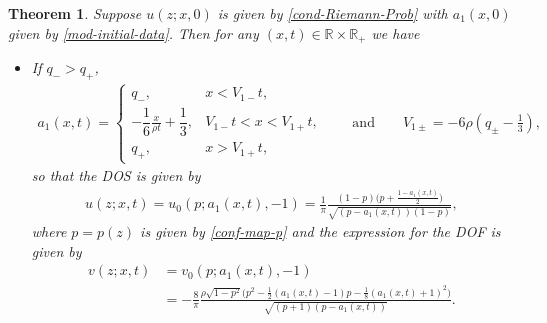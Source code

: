 \documentclass[10pt,a4paper]{amsart}
\numberwithin{equation}{section}
\newtheorem{Theorem}{Theorem}[section]
\def\R{{\mathbb R}}
\begin{document}
\begin{Theorem}\label{Mod-DOS}
Suppose $u(z;x,0)$
is given by \eqref{cond-Riemann-Prob}
with $a_1(x,0)$ given by \eqref{mod-initial-data}. Then for any $(x,t)\in \R\times \R_+$
we have
\begin{itemize}\itemsep=0pt
\item[$(i)$] If $q_->q_+$,
\begin{align*}
a_1(x,t)=\begin{cases}
q_-,& x<V_{1-}t,\\
-\dfrac{1}{6}\frac{x}{\rho t}+\dfrac{1}{3},& V_{1-}t<x<V_{1+}t,\\
q_+,& x>V_{1+}t,
\end{cases}\qquad \text{and} \qquad V_{1\pm}=-6\rho\left(q_\pm-\frac{1}{3}\right),
\end{align*}
so that the DOS is given by
\begin{align}
u(z;x,t)=u_0(p;a_1(x,t),-1)=\frac{1}{\pi}\frac{(1-p)\bigl(p+\frac{1-a_1(x,t)}{2}\bigr)}{\sqrt{(p-a_1(x,t))(1-p)}},\label{eq: mod-dos}
\end{align}
where $p=p(z)$ is given by \eqref{conf-map-p} and the expression for the DOF is given by
\begin{align}
v(z;x,t)&{}=v_0(p;a_1(x,t),-1)\nonumber\\
&{}=-\frac{8}{\pi}\frac{\rho\sqrt{1-p^2}\bigl(p^2-\frac{1}{2}(a_1(x,t)-1)p-\frac{1}{8}(a_1(x,t)+1)^2\bigr)}{\sqrt{(p+1)(p-a_1(x,t))}}.\label{eq: mod-dof}
\end{align}


\end{itemize}
\end{Theorem}
\end{document}
